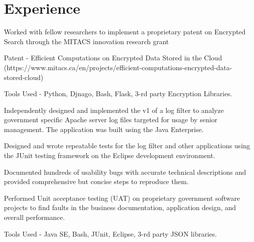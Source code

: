 \documentclass[]{deedy-resume-openfont}
\begin{document}
\begin{minipage}[t]{0.66\textwidth} 


\section{Experience}

\vspace{\topsep} %
\begin{tightemize}\item Worked with fellow researchers to implement a proprietary patent on Encrypted Search through the MITACS innovation research grant\\
\item Patent - Efficient Computations on Encrypted Data Stored in the Cloud (https://www.mitacs.ca/en/projects/efficient-computations-encrypted-data-stored-cloud)
\item Tools Used - Python, Djnago, Bash, Flask, 3-rd party Encryption Libraries.
\end{tightemize}
\sectionsep

\begin{tightemize}
\item Independently designed and implemented the v1 of a log filter to analyze government specific Apache server log files targeted for usage by senior management. The application was built using the Java Enterprise. 
\item Designed and wrote repeatable tests for the log filter and other applications using the JUnit testing framework on the Eclipse development environment.
\item  Documented hundreds of usability bugs with accurate technical descriptions and provided comprehensive but concise steps to reproduce them.
\item Performed Unit acceptance testing (UAT) on proprietary government software projects to find faults in the business documentation, application design, and overall performance.
\item Tools Used - Java SE, Bash, JUnit, Eclipse, 3-rd party JSON libraries.
\end{tightemize}
\sectionsep


\end{minipage}
\end{document}

